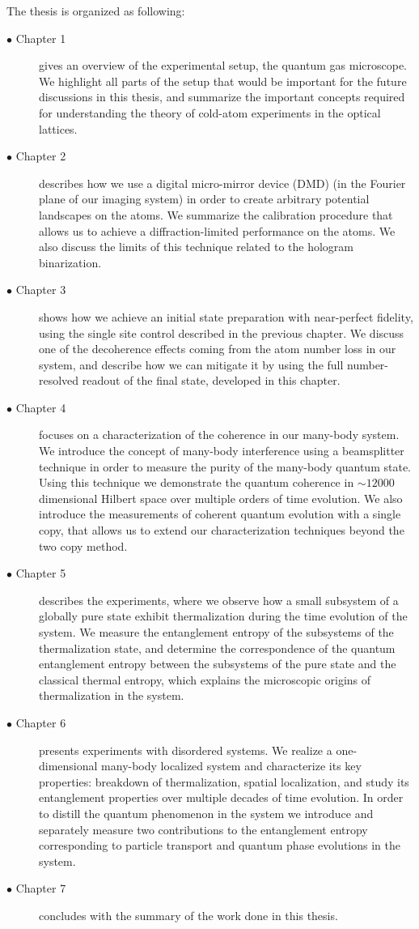 The thesis is organized as following:
\begin{description}
	\item[$\bullet$ Chapter 1] gives an overview of the experimental setup, the quantum gas microscope. We highlight all parts of the setup that would be important for the future discussions in this thesis, and summarize the important concepts required for understanding the theory of cold-atom experiments in the optical lattices.
	\item[$\bullet$ Chapter 2] describes how we use a digital micro-mirror device (DMD) (in the Fourier plane of our imaging system) in order to create arbitrary potential landscapes on the atoms. We summarize the calibration procedure that allows us to achieve a diffraction-limited performance on the atoms. We also discuss the limits of this technique related to the hologram binarization.
	\item[$\bullet$ Chapter 3] shows how we achieve an initial state preparation with near-perfect fidelity, using the single site control described in the previous chapter. We discuss one of the decoherence effects coming from the atom number loss in our system, and describe how we can mitigate it by using the full number-resolved readout of the final state, developed in this chapter.
	\item[$\bullet$ Chapter 4] focuses on a characterization of the coherence in our many-body system. We introduce the concept of many-body interference using a beamsplitter technique in order to measure the purity of the many-body quantum state. Using this technique we demonstrate the quantum coherence in $\sim12000$ dimensional Hilbert space over multiple orders of time evolution. We also introduce the measurements of coherent quantum evolution with a single copy, that allows us to extend our characterization techniques beyond the two copy method. 
	\item[$\bullet$ Chapter 5] describes the experiments, where we observe how a small subsystem of a globally pure state exhibit thermalization during the time evolution of the system. We measure the entanglement entropy of the subsystems of the thermalization state, and determine the correspondence of the quantum entanglement entropy between the subsystems of the pure state and the classical thermal entropy, which explains the microscopic origins of thermalization in the system.
	\item[$\bullet$ Chapter 6] presents experiments with disordered systems. We realize a one-dimensional many-body localized system and characterize its key properties: breakdown of thermalization, spatial localization, and study its entanglement properties over multiple decades of time evolution. In order to distill the quantum phenomenon in the system we introduce and separately measure two contributions to the entanglement entropy corresponding to particle transport and quantum phase evolutions in the system.
	 \item[$\bullet$ Chapter 7] concludes with the summary of the work done in this thesis.
\end{description}